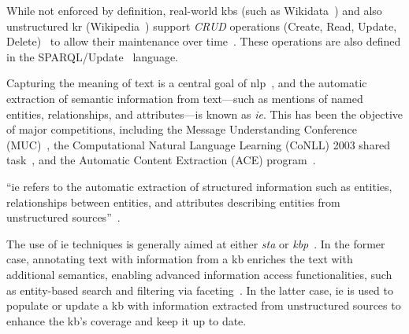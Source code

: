 While not enforced by definition, real-world \acp{kb} (such as Wikidata~\cite{wikidata,vrandevcic2014wikidata}) and also unstructured \ac{kr} (Wikipedia~\cite{wikipedia}) support \emph{CRUD} operations (Create, Read, Update, Delete)~\cite{elmasri2014fundamentals} to allow their maintenance over time~\cite{shafee2023ten_rules_editing_wikidata}. These operations are also defined in the SPARQL/Update~\cite{seaborne2008sparqlupdate} language.




Capturing the meaning of text is a central goal of \acl{nlp}~\cite{entityorientedsearch2018}, and the automatic extraction of semantic information from text---such as mentions of named entities, relationships, and attributes---is known as \emph{\acl{ie}}. This has been the objective of major competitions, including the Message Understanding Conference (MUC)~\cite{muc_lessons_1998,muc6_overview_1995,muc7_overview_1998}, the Computational Natural Language Learning (CoNLL) 2003 shared task~\cite{conll2003}, and the Automatic Content Extraction (ACE) program~\cite{ace_2004}.

\begin{definition}
``\Acf{ie} refers to the automatic extraction of structured information such as entities, relationships between entities, and attributes describing entities from unstructured sources''~\cite{infoextraction2008}.
\end{definition}
The use of \ac{ie} techniques is generally aimed at either \emph{\acl{sta}} or \emph{\acl{kbp}}~\cite{entityorientedsearch2018}.
In the former case, annotating text with information from a \ac{kb} enriches the text with additional semantics, enabling advanced information access functionalities, such as entity-based search and filtering via faceting~\cite{entityorientedsearch2018}.
In the latter case, \ac{ie} is used to populate or update a \ac{kb} with information extracted from unstructured sources to enhance the \ac{kb}'s coverage and keep it up to date.

